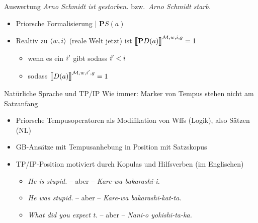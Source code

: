 \begin{frame}
  {Auswertung}
  \onslide<+->
  \onslide<+->
  \textit{Arno Schmidt ist gestorben.} bzw.\ \alert{\textit{Arno Schmidt starb.}}\\
  \Zeile
  \begin{itemize}[<+->]
    \item Priorsche Formalisierung | $\mathbf{P}S(a)$
      \Halbzeile
    \item Realtiv zu ${\langle{}w,i\rangle}$ (reale Welt jetzt) ist \alert{$\DEMM{\mathbf{P}D(a)}=1$}
      \Halbzeile
      \begin{itemize}[<+->]
         \item wenn es ein $i^{\prime}$ gibt sodass $i^{\prime}<i$\\
           \Viertelzeile
         \item sodass $\Dem{D(a)}{\mMm,w,i\Prm,g}=1$
           \end{itemize}
  \end{itemize}
\end{frame}

\begin{frame}
  {Natürliche Sprache und TP\slash IP}
  \onslide<+->
  \onslide<+->
  Wie immer: Marker von Tempus stehen nicht am Satzanfang\\
  \Halbzeile
  \begin{itemize}[<+->]
    \item Priorsche Tempusoperatoren als Modifikation von Wffs (Logik), also \alert{Sätzen} (NL)
    \item GB-Ansätze mit \alert{Tempusanhebung} in Position mit \alert{Satzskopus}
      \Halbzeile
    \item TP\slash IP-Position motiviert durch Kopulas und Hilfsverben (im Englischen)
      \begin{itemize}[<+->]
        \item \textit{He \alert{is} stupid.} -- aber -- \textit{Kare-wa bakarashi-\alert{i}.}
        \item \textit{He \alert{was} stupid.} -- aber -- \textit{Kare-wa bakarashi-kat-\alert{ta}.}
        \item \textit{What \alert{did} you expect t.} -- aber -- \textit{Nani-o yokishi-\alert{ta}-ka.}
      \end{itemize}
  \end{itemize}
\end{frame}

